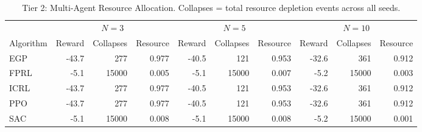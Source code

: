 \begin{table}[h]
\centering
\caption{Tier 2: Multi-Agent Resource Allocation. Collapses = total resource depletion events across all seeds.}
\label{tab:tier2-allalgo}
\begin{tabular}{l rrr rrr rrr}
\toprule
& \multicolumn{3}{c}{$N=3$} & \multicolumn{3}{c}{$N=5$} & \multicolumn{3}{c}{$N=10$} \\
\cmidrule(lr){2-4}\cmidrule(lr){5-7}\cmidrule(lr){8-10}
Algorithm & Reward & Collapses & Resource & Reward & Collapses & Resource & Reward & Collapses & Resource \\
\midrule
EGP & -43.7 & 277 & 0.977 & -40.5 & 121 & 0.953 & -32.6 & 361 & 0.912 \\
FPRL & -5.1 & 15000 & 0.005 & -5.1 & 15000 & 0.007 & -5.2 & 15000 & 0.003 \\
ICRL & -43.7 & 277 & 0.977 & -40.5 & 121 & 0.953 & -32.6 & 361 & 0.912 \\
PPO & -43.7 & 277 & 0.977 & -40.5 & 121 & 0.953 & -32.6 & 361 & 0.912 \\
SAC & -5.1 & 15000 & 0.008 & -5.1 & 15000 & 0.008 & -5.2 & 15000 & 0.001 \\
\bottomrule
\end{tabular}
\end{table}
